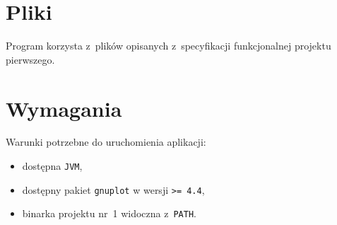 \documentclass[10pt,a4paper]{article}
\newcommand{\prog}[1]{\texttt{#1}}
\begin{document}
\section{Pliki}
\label{sec:pliki}

Program korzysta z~plików opisanych z~specyfikacji funkcjonalnej projektu
pierwszego.

\section{Wymagania}
\label{sec:wymagania}

Warunki potrzebne do uruchomienia aplikacji:
\begin{itemize}
  \item dostępna \prog{JVM},
  \item dostępny pakiet \prog{gnuplot} w wersji \prog{>= 4.4},
  \item binarka projektu nr~1 widoczna z~\prog{PATH}.
\end{itemize}
\end{document}
